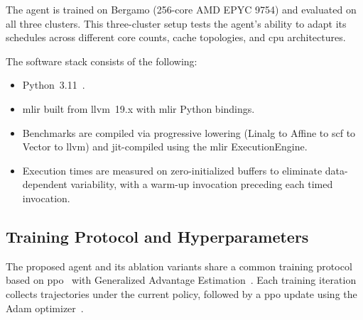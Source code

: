 The agent is trained on Bergamo (256-core AMD EPYC 9754) and evaluated on all three clusters. This three-cluster setup tests the agent's ability to adapt its schedules across different core counts, cache topologies, and \gls{cpu} architectures.

The software stack consists of the following:
\begin{itemize}
    \item Python~3.11~\cite{paszke2019pytorch}.
    \item \gls{mlir} built from \gls{llvm}~19.x with \gls{mlir} Python bindings.
    \item Benchmarks are compiled via progressive lowering (Linalg to Affine to \gls{scf} to Vector to \gls{llvm}) and \gls{jit}-compiled using the \gls{mlir} ExecutionEngine.
    \item Execution times are measured on zero-initialized buffers to eliminate data-dependent variability, with a warm-up invocation preceding each timed invocation.
\end{itemize}

\subsection{Training Protocol and Hyperparameters}

The proposed agent and its ablation variants share a common training protocol based on \gls{ppo}~\cite{schulman2017ppo} with Generalized Advantage Estimation~\cite{schulman2015gae}. Each training iteration collects trajectories under the current policy, followed by a \gls{ppo} update using the Adam optimizer~\cite{kingma2014adam}.

